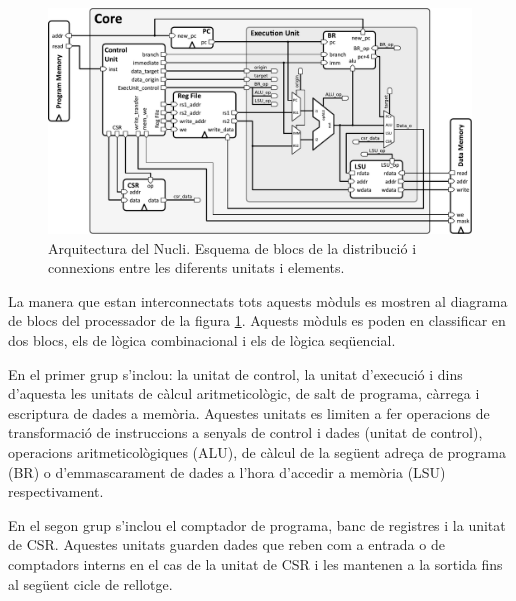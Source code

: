 \documentclass[10pt,a4paper,twocolumn,twoside]{article}
\begin{document}
    \label{sec:arch}
    \begin{figure}[!ht]
    \centering
    	\includegraphics[width=0.9\linewidth]{pdf/arch_RiscV.pdf}
        \caption{Arquitectura del Nucli. Esquema de blocs de la distribució i connexions entre les diferents unitats i elements.}
        \label{fig:core_arch}
    \end{figure}
    

    
    La manera que estan interconnectats tots aquests mòduls es mostren al diagrama de blocs del processador de la figura \ref{fig:core_arch}. Aquests mòduls es poden en classificar en dos blocs, els de lògica combinacional i els de lògica seqüencial. 
    
    En el primer grup s'inclou: la unitat de control, la unitat d'execució i dins d'aquesta les unitats de càlcul aritmeticològic, de salt de programa, càrrega i escriptura de dades a memòria. Aquestes unitats es limiten a fer operacions de transformació de instruccions a senyals de control i dades (unitat de control), operacions aritmeticològiques (ALU), de càlcul de la següent adreça de programa (BR) o d'emmascarament de dades a l'hora d'accedir a memòria (LSU) respectivament.
    
    En el segon grup s'inclou el comptador de programa, banc de registres i la unitat de CSR.
    Aquestes unitats guarden dades que reben com a entrada o de comptadors interns en el cas de la unitat de CSR i les mantenen a la sortida fins al següent cicle de rellotge. 
    
\end{document}
